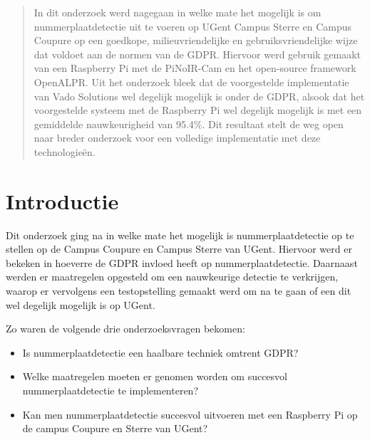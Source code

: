 \documentclass[a0,portrait]{a0poster}
\begin{document}
\begin{multicols}{2} %


\color{HoGentAccent1} %

\begin{abstract}

In dit onderzoek werd nagegaan in welke mate het mogelijk is om nummerplaatdetectie uit te voeren op UGent Campus Sterre en Campus Coupure op een goedkope, milieuvriendelijke en gebruiksvriendelijke wijze dat voldoet aan de normen van de GDPR. Hiervoor werd gebruik gemaakt van een Raspberry Pi met de PiNoIR-Cam en het open-source framework OpenALPR. Uit het onderzoek bleek dat de voorgestelde implementatie van Vado Solutions wel degelijk mogelijk is onder de GDPR, alsook dat het voorgestelde systeem met de Raspberry Pi wel degelijk mogelijk is met een gemiddelde nauwkeurigheid van 95.4\%. Dit resultaat stelt de weg open naar breder onderzoek voor een volledige implementatie met deze technologieën.
\end{abstract}

\color{HoGentAccent1} 
\section*{Introductie}
\color{black}
\color{black}
Dit onderzoek ging na in welke mate het mogelijk is nummerplaatdetectie op te stellen op de Campus Coupure en Campus Sterre van UGent. Hiervoor werd er bekeken in hoeverre de GDPR invloed heeft op nummerplaatdetectie. Daarnaast werden er maatregelen opgesteld om een nauwkeurige detectie te verkrijgen, waarop er vervolgens een testopstelling gemaakt werd om na te gaan of een dit wel degelijk mogelijk is op UGent.

Zo waren de volgende drie onderzoeksvragen bekomen:
\begin{itemize}
	\item Is nummerplaatdetectie een haalbare techniek omtrent GDPR?
	\item Welke maatregelen moeten er genomen worden om succesvol nummerplaatdetectie te implementeren?
	\item Kan men nummerplaatdetectie succesvol uitvoeren met een Raspberry Pi op de campus Coupure en Sterre van UGent?
\end{itemize}


\end{multicols}
\end{document}
